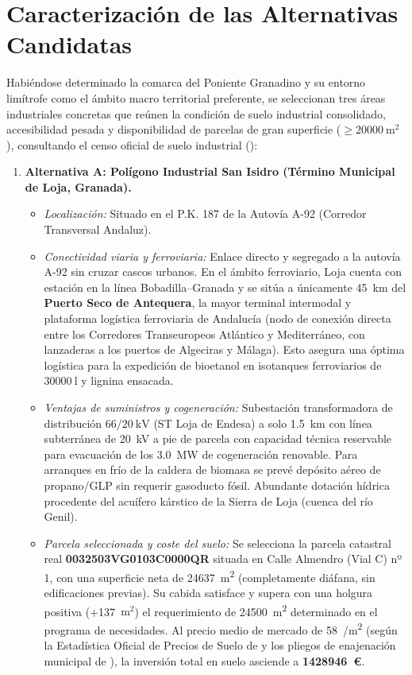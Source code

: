 \documentclass{report}
\begin{document}
\section{Caracterización de las Alternativas Candidatas}
Habiéndose determinado la comarca del Poniente Granadino y su entorno limítrofe como el ámbito macro territorial preferente, se seleccionan tres áreas industriales concretas que reúnen la condición de suelo industrial consolidado, accesibilidad pesada y disponibilidad de parcelas de gran superficie ($\ge \SI{20000}{\square\metre}$), consultando el censo oficial de suelo industrial (\autocite{SueloIndustrial2026}):
\begin{enumerate}
    \item \textbf{Alternativa A: Polígono Industrial San Isidro (Término Municipal de Loja, Granada).}
          \begin{itemize}
              \item \textit{Localización:} Situado en el P.K. 187 de la Autovía A-92 (Corredor Transversal Andaluz).
              \item \textit{Conectividad viaria y ferroviaria:} Enlace directo y segregado a la autovía A-92 sin cruzar cascos urbanos. En el ámbito ferroviario, Loja cuenta con estación en la línea Bobadilla--Granada y se sitúa a únicamente \SI{45}{\kilo\metre} del \textbf{Puerto Seco de Antequera}, la mayor terminal intermodal y plataforma logística ferroviaria de Andalucía (nodo de conexión directa entre los Corredores Transeuropeos Atlántico y Mediterráneo, con lanzaderas a los puertos de Algeciras y Málaga). Esto asegura una óptima logística para la expedición de bioetanol en isotanques ferroviarios de $\SI{30000}{\litre}$ y lignina ensacada.
              \item \textit{Ventajas de suministros y cogeneración:} Subestación transformadora de distribución $66/\SI{20}{\kilo\volt}$ (ST Loja de Endesa) a solo \SI{1.5}{\kilo\metre} con línea subterránea de 20~kV a pie de parcela con capacidad técnica reservable para evacuación de los \SI{3.0}{\mega\watt} de cogeneración renovable. Para arranques en frío de la caldera de biomasa se prevé depósito aéreo de propano/GLP sin requerir gasoducto fósil. Abundante dotación hídrica procedente del acuífero kárstico de la Sierra de Loja (cuenca del río Genil).
              \item \textit{Parcela seleccionada y coste del suelo:} Se selecciona la parcela catastral real \mbox{\textbf{0032503VG0103C0000QR}} situada en Calle Almendro (Vial C) nº 1, con una superficie neta de \SI{24637}{\square\metre} (completamente diáfana, sin edificaciones previas). Su cabida satisface y supera con una holgura positiva (+137~$\text{m}^2$) el requerimiento de \SI{24500}{\square\metre} determinado en el programa de necesidades. Al precio medio de mercado de \SI{58}{/\metre\squared} (según la Estadística Oficial de Precios de Suelo de \textcite{MIVAU2026} y los pliegos de enajenación municipal de \textcite{AytoLoja2025}), la inversión total en suelo asciende a \textbf{\num{1428946}~€}.

\end{itemize}
\end{enumerate}
\end{document}
